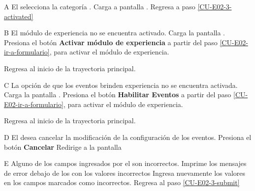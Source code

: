 \begin{UCtrayectoriaA}{A}{%
El  selecciona la categoría .
}
  \Sistema Carga a pantalla .
  \Actor Regresa a paso \ref{CU-E02-3-activated}
\end{UCtrayectoriaA}

\begin{UCtrayectoriaA}{B}{%
El módulo de experiencia no se encuentra activado.
}
  \Sistema Carga la pantalla .
  \Actor Presiona el botón {\bf Activar módulo de experiencia}
   a partir del paso \ref{CU-E02-ir-a-formulario},
                     para activar el módulo de experiencia.

  \Sistema Regresa al inicio de la trayectoria principal.
\end{UCtrayectoriaA}

\begin{UCtrayectoriaA}{C}{%
La opción de que los eventos brinden experiencia no se encuentra activada.
}
  \Sistema Carga la pantalla .
  \Actor Presiona el botón {\bf Habilitar Eventos}
   a partir del paso \ref{CU-E02-ir-a-formulario},
                     para activar el módulo de experiencia.

  \Sistema Regresa al inicio de la trayectoria principal.
\end{UCtrayectoriaA}

\begin{UCtrayectoriaA}{D}{%
El  desea cancelar la modificación de la configuración
de los eventos.
}
  \Actor Presiona el botón {\bf Cancelar}
  \Sistema Redirige a la pantalla 
\end{UCtrayectoriaA}

\begin{UCtrayectoriaA}{E}{%
Alguno de los campos ingresados por el  son incorrectos.
}
  \Sistema Imprime los mensajes de error debajo de los con los valores incorrectos
  \Actor Ingresa nuevamente los valores en los campos marcados como incorrectos.
  \Sistema Regresa al paso \ref{CU-E02-3-submit}
\end{UCtrayectoriaA}

